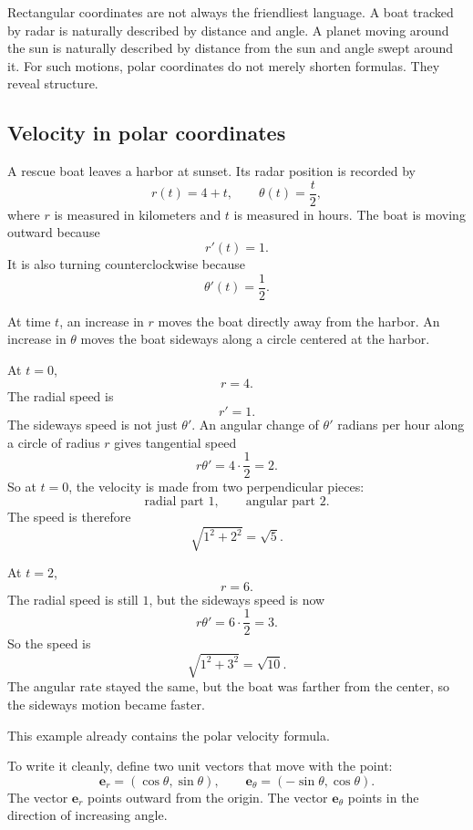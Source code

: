 Rectangular coordinates are not always the friendliest language.  A boat tracked by
radar is naturally described by distance and angle.  A planet moving around the sun is
naturally described by distance from the sun and angle swept around it.  For such
motions, polar coordinates do not merely shorten formulas.  They reveal structure.

\subsection{Velocity in polar coordinates}

A rescue boat leaves a harbor at sunset.  Its radar position is recorded by
\[
    r(t)=4+t,
    \qquad
    \theta(t)=\frac{t}{2},
\]
where \(r\) is measured in kilometers and \(t\) is measured in hours.  The boat is
moving outward because
\[
    r'(t)=1.
\]
It is also turning counterclockwise because
\[
    \theta'(t)=\frac12.
\]

At time \(t\), an increase in \(r\) moves the boat directly away from the harbor.  An
increase in \(\theta\) moves the boat sideways along a circle centered at the harbor.

At \(t=0\),
\[
    r=4.
\]
The radial speed is
\[
    r'=1.
\]
The sideways speed is not just \(\theta'\).  An angular change of \(\theta'\) radians per
hour along a circle of radius \(r\) gives tangential speed
\[
    r\theta'=4\cdot\frac12=2.
\]
So at \(t=0\), the velocity is made from two perpendicular pieces:
\[
    \text{radial part } 1,
    \qquad
    \text{angular part } 2.
\]
The speed is therefore
\[
    \sqrt{1^2+2^2}=\sqrt5.
\]

At \(t=2\),
\[
    r=6.
\]
The radial speed is still \(1\), but the sideways speed is now
\[
    r\theta'=6\cdot\frac12=3.
\]
So the speed is
\[
    \sqrt{1^2+3^2}=\sqrt{10}.
\]
The angular rate stayed the same, but the boat was farther from the center, so the
sideways motion became faster.

This example already contains the polar velocity formula.

To write it cleanly, define two unit vectors that move with the point:
\[
\boxed{
    \mathbf e_r=(\cos\theta,\sin\theta),
    \qquad
    \mathbf e_\theta=(-\sin\theta,\cos\theta).
}
\]
The vector \(\mathbf e_r\) points outward from the origin.  The vector \(\mathbf e_\theta\)
points in the direction of increasing angle.

